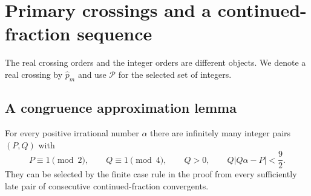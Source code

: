 \section{Primary crossings and a continued-fraction sequence}\label{inf:sec-arithmetic}

The real crossing orders and the integer orders are different objects.
We denote a real crossing by $\widehat p_m$ and use $\mathcal P$ for
the selected set of integers.

\subsection{A congruence approximation lemma}

\begin{lemma}\label{inf:congruence}
For every positive irrational number $\alpha$ there are infinitely many
integer pairs $(P,Q)$ with
\begin{equation}\label{inf:congruence-target}
 P\equiv1\pmod2,\qquad Q\equiv1\pmod4,\qquad Q>0,
 \qquad Q|Q\alpha-P|<\frac92.
\end{equation}
They can be selected by the finite case rule in the proof from every
sufficiently late pair of consecutive continued-fraction convergents.
\end{lemma}
